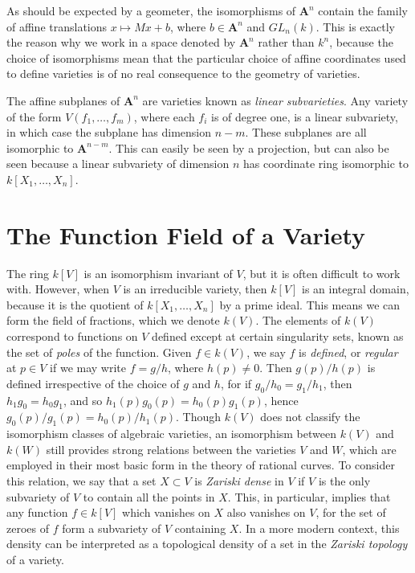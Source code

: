 As should be expected by a geometer, the isomorphisms of $\mathbf{A}^n$ contain the family of affine translations $x \mapsto Mx + b$, where $b \in \mathbf{A}^n$ and $GL_n(k)$. This is exactly the reason why we work in a space denoted by $\mathbf{A}^n$ rather than $k^n$, because the choice of isomorphisms mean that the particular choice of affine coordinates used to define varieties is of no real consequence to the geometry of varieties.

\begin{example}
    The affine subplanes of $\mathbf{A}^n$ are varieties known as \emph{linear subvarieties}. Any variety of the form $V(f_1, \dots, f_m)$, where each $f_i$ is of degree one, is a linear subvariety, in which case the subplane has dimension $n-m$. These subplanes are all isomorphic to $\mathbf{A}^{n-m}$. This can easily be seen by a projection, but can also be seen because a linear subvariety of dimension $n$ has coordinate ring isomorphic to $k[X_1, \dots, X_n]$.
\end{example}

\section{The Function Field of a Variety}

The ring $k[V]$ is an isomorphism invariant of $V$, but it is often difficult to work with. However, when $V$ is an irreducible variety, then $k[V]$ is an integral domain, because it is the quotient of $k[X_1, \dots, X_n]$ by a prime ideal. This means we can form the field of fractions, which we denote $k(V)$. The elements of $k(V)$ correspond to functions on $V$ defined except at certain singularity sets, known as the set of \emph{poles} of the function. Given $f \in k(V)$, we say $f$ is \emph{defined}, or \emph{regular} at $p \in V$ if we may write $f = g/h$, where $h(p) \neq 0$. Then $g(p)/h(p)$ is defined irrespective of the choice of $g$ and $h$, for if $g_0/h_0 = g_1/h_1$, then $h_1g_0 = h_0g_1$, and so $h_1(p)g_0(p) = h_0(p)g_1(p)$, hence $g_0(p)/g_1(p) = h_0(p)/h_1(p)$. Though $k(V)$ does not classify the isomorphism classes of algebraic varieties, an isomorphism between $k(V)$ and $k(W)$ still provides strong relations between the varieties $V$ and $W$, which are employed in their most basic form in the theory of rational curves. To consider this relation, we say that a set $X \subset V$ is \emph{Zariski dense} in $V$ if $V$ is the only subvariety of $V$ to contain all the points in $X$. This, in particular, implies that any function $f \in k[V]$ which vanishes on $X$ also vanishes on $V$, for the set of zeroes of $f$ form a subvariety of $V$ containing $X$. In a more modern context, this density can be interpreted as a topological density of a set in the \emph{Zariski topology} of a variety.

